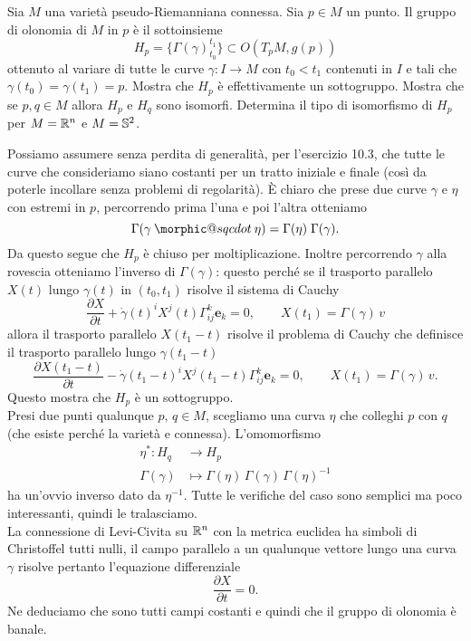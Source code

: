 \documentclass[a4paper]{article}
\makeatletter
\DeclareRobustCommand{\sqcdot}{\mathbin{\mathpalette\morphic@sqcdot\relax}}
\newcommand{\morphic@sqcdot}[2]{%
	\sbox\z@{$\m@th#1\centerdot$}%
	\ht\z@=.33333\ht\z@
	\vcenter{\box\z@}%
}
\makeatother
\begin{document}
\begin{ex}[10.4]{Sia $ M $ una varietà pseudo-Riemanniana connessa. Sia $ p \in M $ un punto. Il gruppo di olonomia di $ M $ in $ p $ è il sottoinsieme
\[ H_p = \{ \Gamma(\gamma)_{t_0}^{t_1} \} \subset O(T_pM, g(p)) \]
ottenuto al variare di tutte le curve $ \gamma \colon I \to M $ con $ t_0 < t_1 $ contenuti in $ I $ e
tali che $ \gamma(t_0) = \gamma(t_1) = p $. Mostra che $ H_p $ è effettivamente un sottogruppo.
Mostra che se $ p, q \in M $ allora $ H_p $ e $ H_q $ sono isomorfi. Determina il tipo di isomorfismo di $ H_p $ per $ M = \R^n $ e $ M = \S^2 $.}
	
	Possiamo assumere senza perdita di generalità, per l'esercizio 10.3, che tutte le curve che consideriamo siano costanti per un tratto iniziale e finale (così da poterle incollare senza problemi di regolarità). È chiaro che prese due curve $ \gamma $ e $ \eta $ con estremi in $ p $, percorrendo prima l'una e poi l'altra otteniamo
	\[ \Gamma(\gamma \sqcdot \eta) = \Gamma(\eta) \; \Gamma(\gamma).  \]
	Da questo segue che $ H_p $ è chiuso per moltiplicazione. Inoltre percorrendo $ \gamma $ alla rovescia otteniamo l'inverso di $ \Gamma(\gamma) $: questo perché se il trasporto parallelo $ X(t) $ lungo $ \gamma(t) $ in $ (t_0, t_1) $ risolve il sistema di Cauchy
	\[\frac{\partial X}{\partial t } + \dot{\gamma}(t)^iX^j(t)\Gamma_{ij}^k\textbf{e}_k = 0, \qquad X(t_1) = \Gamma(\gamma) \, v \]
	allora il trasporto parallelo $ X(t_1-t) $ risolve il problema di Cauchy che definisce il trasporto parallelo lungo $ \gamma(t_1-t) $
	\[ \frac{\partial X(t_1-t)}{\partial t } -\dot{\gamma}(t_1-t)^iX^j(t_1-t)\Gamma_{ij}^k\textbf{e}_k = 0, \qquad X(t_1) = \Gamma(\gamma) \, v. \]
	Questo mostra che $ H_p $ è un sottogruppo.\\
	
	Presi due punti qualunque $ p, \, q \in M $, scegliamo una curva $ \eta $ che colleghi $ p $ con $ q $ (che esiste perché la varietà e connessa). L'omomorfismo
	\begin{align*}
		\eta^* \colon H_q &\to H_p\\
		\Gamma(\gamma) & \mapsto \Gamma(\eta)\,\Gamma(\gamma)\,\Gamma(\eta)^{-1}
	\end{align*}
	ha un'ovvio inverso dato da $ \eta^{-1} $. Tutte le verifiche del caso sono semplici ma poco interessanti, quindi le tralasciamo. \\
	
	La connessione di Levi-Civita su $ \R^n $ con la metrica euclidea ha simboli di Christoffel tutti nulli, il campo parallelo a un qualunque vettore lungo una curva $ \gamma $ risolve pertanto l'equazione differenziale 
	\[ \frac{\partial X}{\partial t} = 0. \]
	Ne deduciamo che sono tutti campi costanti e quindi che il gruppo di olonomia è banale.\\
	

\end{ex}
\end{document}
